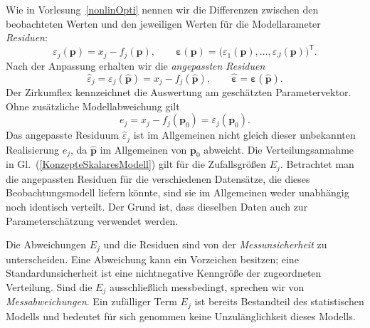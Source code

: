 Wie in Vorlesung~\ref{nonlinOpti} nennen wir die Differenzen zwischen den beobachteten Werten und den jeweiligen Werten für die Modellarameter \textsl{Residuen}:
\begin{equation}
\varepsilon_j(\mathbf{p})=x_j-f_j(\mathbf{p}),
\qquad
\boldsymbol{\varepsilon}(\mathbf{p})
=\bigl(\varepsilon_1(\mathbf{p}),\dots,\varepsilon_J(\mathbf{p})\bigr)^\mathsf{T}.
\label{KonzepteResiduenfunktion}
\end{equation}
Nach der Anpassung erhalten wir die \textsl{angepassten Residuen}
\begin{equation}
\widehat{\varepsilon}_j
=\varepsilon_j(\widehat{\mathbf{p}})
=x_j-f_j(\widehat{\mathbf{p}}),
\qquad
\widehat{\boldsymbol{\varepsilon}}
=\boldsymbol{\varepsilon}(\widehat{\mathbf{p}}).
\label{KonzepteAngepassteResiduen}
\end{equation}
Der Zirkumflex kennzeichnet die Auswertung am geschätzten Parametervektor.
Ohne zusätzliche Modellabweichung gilt
\begin{equation}
e_j=x_j-f_j(\mathbf{p}_0)=\varepsilon_j(\mathbf{p}_0).
\label{KonzepteRealisierteAbweichung}
\end{equation}
Das angepasste Residuum $\widehat{\varepsilon}_j$ ist im Allgemeinen
nicht gleich dieser unbekannten Realisierung $e_j$, da
$\widehat{\mathbf{p}}$ im Allgemeinen von $\mathbf{p}_0$ abweicht.
Die Verteilungsannahme in Gl.~(\ref{KonzepteSkalaresModell}) gilt für die
Zufallsgrößen $E_j$. Betrachtet man die angepassten Residuen für
die verschiedenen Datensätze, die dieses Beobachtungsmodell liefern
könnte, sind sie im Allgemeinen weder unabhängig noch identisch
verteilt. Der Grund ist, dass dieselben Daten auch zur Parameterschätzung
verwendet werden.

Die Abweichungen $E_j$ und die Residuen sind von der
\textsl{Messunsicherheit} zu unterscheiden. Eine Abweichung kann ein
Vorzeichen besitzen; eine Standardunsicherheit ist eine nichtnegative
Kenngröße der zugeordneten Verteilung. Sind die $E_j$ ausschließlich
messbedingt, sprechen wir von \textsl{Messabweichungen}.
Ein zufälliger Term $E_j$ ist bereits Bestandteil des statistischen
Modells und bedeutet für sich genommen keine Unzulänglichkeit dieses
Modells.

